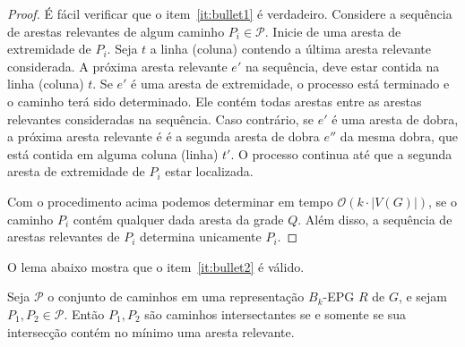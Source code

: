 \begin{proof}
É fácil verificar que o item~\ref{it:bullet1} é verdadeiro. Considere a sequência de arestas relevantes de algum caminho $P_i\in \mathcal{P}$. Inicie de uma aresta de extremidade de $P_i$. Seja   $t$ a linha (coluna) contendo a última aresta relevante considerada. A próxima aresta relevante  $e'$ na sequência, deve estar contida na linha (coluna) $t$. Se $e'$ é uma aresta de extremidade, o processo está terminado e o caminho terá sido determinado. Ele contém todas arestas entre as arestas relevantes consideradas na sequência.  Caso contrário, se  $e'$ é uma aresta de dobra, a próxima aresta relevante é é a segunda aresta de dobra  $e''$ da mesma dobra, que está contida em alguma coluna (linha) $t'$. O processo continua até que a segunda aresta de extremidade de $P_i$ estar localizada.   

Com o procedimento acima podemos determinar em tempo $\mathcal{O}(k\cdot |V(G)|)$, se o caminho $P_i$ contém qualquer dada aresta da grade $Q$. Além disso, a sequência de arestas relevantes de  $P_i$ determina unicamente  $P_i$.
 \end{proof} %

O lema abaixo mostra que o item~\ref{it:bullet2} é válido.

\begin{lema}\label{lem:relevantEdges}
Seja $\mathcal{P}$ o conjunto de caminhos em uma representação $B_k$-EPG $R$ de $G$, e sejam $P_1,P_2 \in \mathcal{P}$. Então $P_1, P_2$ são caminhos intersectantes se e somente se sua intersecção contém no mínimo uma aresta relevante.%
\end{lema}

